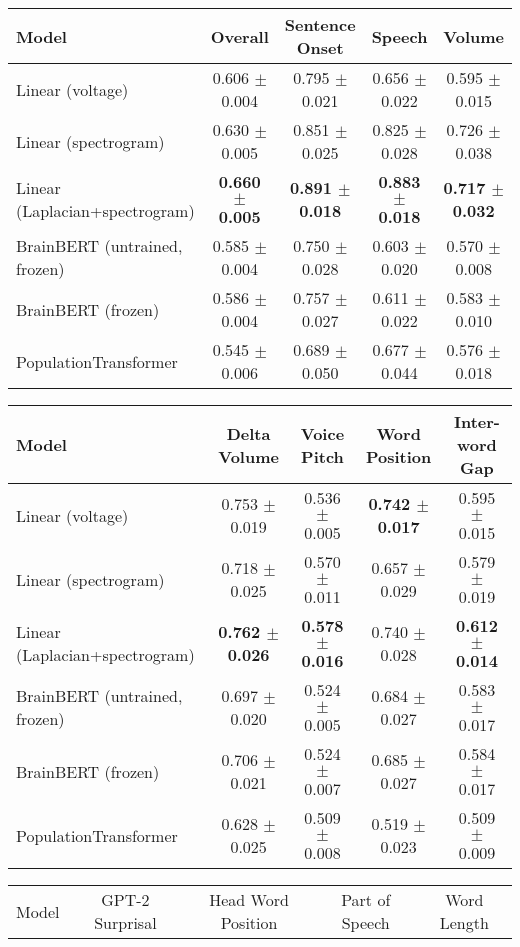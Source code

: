 \begin{table}[h]
\centering
\begin{tabular}{lcccc}
\hline
Model & Overall & Sentence Onset & Speech & Volume \\
\hline
Linear (voltage) & 0.606 $\pm$ 0.004 & 0.795 $\pm$ 0.021 & 0.656 $\pm$ 0.022 & 0.595 $\pm$ 0.015 \\
Linear (spectrogram) & 0.630 $\pm$ 0.005 & 0.851 $\pm$ 0.025 & 0.825 $\pm$ 0.028 & 0.726 $\pm$ 0.038 \\
Linear (Laplacian+spectrogram) & \textbf{0.660 $\pm$ 0.005} & \textbf{0.891 $\pm$ 0.018} & \textbf{0.883 $\pm$ 0.018} & \textbf{0.717 $\pm$ 0.032} \\
BrainBERT (untrained, frozen) & 0.585 $\pm$ 0.004 & 0.750 $\pm$ 0.028 & 0.603 $\pm$ 0.020 & 0.570 $\pm$ 0.008 \\
BrainBERT (frozen) & 0.586 $\pm$ 0.004 & 0.757 $\pm$ 0.027 & 0.611 $\pm$ 0.022 & 0.583 $\pm$ 0.010 \\
PopulationTransformer & 0.545 $\pm$ 0.006 & 0.689 $\pm$ 0.050 & 0.677 $\pm$ 0.044 & 0.576 $\pm$ 0.018 \\
\hline
\end{tabular}
\hspace{1em}
\begin{tabular}{lcccc}
\hline
Model & Delta Volume & Voice Pitch & Word Position & Inter-word Gap \\
\hline
Linear (voltage) & 0.753 $\pm$ 0.019 & 0.536 $\pm$ 0.005 & \textbf{0.742 $\pm$ 0.017} & 0.595 $\pm$ 0.015 \\
Linear (spectrogram) & 0.718 $\pm$ 0.025 & 0.570 $\pm$ 0.011 & 0.657 $\pm$ 0.029 & 0.579 $\pm$ 0.019 \\
Linear (Laplacian+spectrogram) & \textbf{0.762 $\pm$ 0.026} & \textbf{0.578 $\pm$ 0.016} & 0.740 $\pm$ 0.028 & \textbf{0.612 $\pm$ 0.014} \\
BrainBERT (untrained, frozen) & 0.697 $\pm$ 0.020 & 0.524 $\pm$ 0.005 & 0.684 $\pm$ 0.027 & 0.583 $\pm$ 0.017 \\
BrainBERT (frozen) & 0.706 $\pm$ 0.021 & 0.524 $\pm$ 0.007 & 0.685 $\pm$ 0.027 & 0.584 $\pm$ 0.017 \\
PopulationTransformer & 0.628 $\pm$ 0.025 & 0.509 $\pm$ 0.008 & 0.519 $\pm$ 0.023 & 0.509 $\pm$ 0.009 \\
\hline
\end{tabular}
\hspace{1em}
\begin{tabular}{lcccc}
\hline
Model & GPT-2 Surprisal & Head Word Position & Part of Speech & Word Length \\

\end{tabular}
\end{table}
